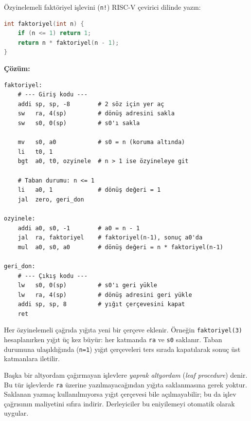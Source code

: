 \begin{ornek}[3.19]
\label{orn:faktoriyel}
Özyinelemeli faktöriyel işlevini (\texttt{n!}) RISC-V çevirici dilinde yazın:
\begin{lstlisting}[language=C]
int faktoriyel(int n) {
    if (n <= 1) return 1;
    return n * faktoriyel(n - 1);
}
\end{lstlisting}

\textbf{Çözüm:}
\begin{lstlisting}[style=riscv]
faktoriyel:
    # --- Giriş kodu ---
    addi sp, sp, -8        # 2 söz için yer aç
    sw   ra, 4(sp)         # dönüş adresini sakla
    sw   s0, 0(sp)         # s0'ı sakla

    mv   s0, a0            # s0 = n (koruma altında)
    li   t0, 1
    bgt  a0, t0, ozyinele  # n > 1 ise özyineleye git

    # Taban durumu: n <= 1
    li   a0, 1             # dönüş değeri = 1
    jal  zero, geri_don

ozyinele:
    addi a0, s0, -1        # a0 = n - 1
    jal  ra, faktoriyel    # faktoriyel(n-1), sonuç a0'da
    mul  a0, s0, a0        # dönüş değeri = n * faktoriyel(n-1)

geri_don:
    # --- Çıkış kodu ---
    lw   s0, 0(sp)         # s0'ı geri yükle
    lw   ra, 4(sp)         # dönüş adresini geri yükle
    addi sp, sp, 8         # yığıt çerçevesini kapat
    ret
\end{lstlisting}

Her özyinelemeli çağrıda yığıta yeni bir çerçeve eklenir. Örneğin \texttt{faktoriyel(3)} hesaplanırken yığıt üç kez büyür: her katmanda \texttt{ra} ve \texttt{s0} saklanır. Taban durumuna ulaşıldığında (\texttt{n=1}) yığıt çerçeveleri ters sırada kapatılarak sonuç üst katmanlara iletilir.
\end{ornek}

\begin{bilginot}
Başka bir altyordam çağırmayan işlevlere \emph{yaprak altyordam} (\textit{leaf procedure}) denir. Bu tür işlevlerde \texttt{ra} üzerine yazılmayacağından yığıta saklanmasına gerek yoktur. Saklanan yazmaç kullanılmıyorsa yığıt çerçevesi bile açılmayabilir; bu da işlev çağrısının maliyetini sıfıra indirir. Derleyiciler bu eniyilemeyi otomatik olarak uygular.
\end{bilginot}

